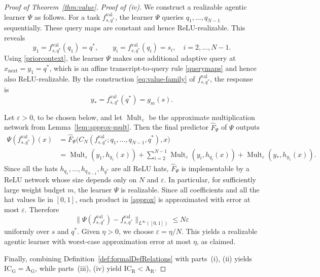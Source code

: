 \documentclass{article}
\newcommand{\ICG}{\mathrm{IC_G}}
\newcommand{\ICR}{\mathrm{IC_R}}
\newcommand{\AG}{\mathrm{A_G}}
\newcommand{\AR}{\mathrm{A_R}}
\begin{document}
\begin{proof}[Proof of Theorem~\ref{thm:value}]
\medskip
\noindent
\emph{Proof of (iv).}
We construct a realizable agentic learner $\Psi$ as follows.
For a task $f^{\mathrm{val}}_{s,q^\ast}$, the learner $\Psi$ queries $q_1,\dots,q_{N-1}$ sequentially. These query maps are constant and hence ReLU-realizable. This reveals
\begin{equation} \label{priorcontext}
    y_1=f^{\mathrm{val}}_{s,q^\ast}(q_1)=q^\ast,
    \qquad
    y_i=f^{\mathrm{val}}_{s,q^\ast}(q_i)=s_i,\quad i=2,\dots,N-1.
\end{equation}
Using \eqref{priorcontext}, the learner $\Psi$ makes one additional adaptive query at
$
    x_{\mathrm{next}}=y_1=q^\ast
$,
which is an affine transcript-to-query rule \eqref{querymaps} and hence also ReLU-realizable. 
By the construction \eqref{eq:value-family} of $f^{\mathrm{val}}_{s,q^\ast}$, the response is
\[
y_*=f^{\mathrm{val}}_{s,q^\ast}(q^\ast)=g_m(s).
\]

Let \(\varepsilon>0\), to be chosen below, and let
\(\operatorname{Mult}_{\varepsilon}\) be the approximate multiplication network from
Lemma~\ref{lem:approx-mult}. 
Then the final predictor $\widehat{F}_{\Psi}$ of $\Psi$ outputs
\begin{align} \label{approx}
    \nonumber \Psi(f^{\mathrm{val}}_{s,q^\ast})(x)
    &= 
    \widehat{F}_{\Psi}
    \bigl(C_N(f^{\mathrm{val}}_{s,q^\ast};q_1,\dots,q_{N-1},q^{\ast}),x\bigr)\\
    &=
    \operatorname{Mult}_{\varepsilon}(y_1,h_{q_1}(x))
    +
    \sum_{i=2}^{N-1}
    \operatorname{Mult}_{\varepsilon}(y_i,h_{q_i}(x))
    +
    \operatorname{Mult}_{\varepsilon}(y_*,h_{y_1}(x)).
\end{align}
Since all the hats $h_{q_1},\dots,h_{q_{N-1}}, h_{q^\ast}$ are all ReLU hats,
$\widehat{F}_{\Psi}$
is implementable by a ReLU network whose size depends only on $N$ and
\(\varepsilon\).
In particular, for sufficiently large weight budget $m$, the learner $\Psi$ is realizable.
Since all coefficients and all the hat values lie in $[0,1]$, each product in \eqref{approx} is approximated with error
at most \(\varepsilon\). Therefore
\[
    \|\Psi(f^{\mathrm{val}}_{s,q^\ast}) - f^{\mathrm{val}}_{s,q^\ast}\|_{L^\infty([0,1])}
    \leq N\varepsilon
\]
uniformly over $s$ and $q^\ast$. Given \(\eta>0\), we choose \(\varepsilon=\eta/N\). This yields a realizable agentic learner with worst-case approximation error at most $\eta$, as claimed.

Finally, combining Definition~\ref{def:formalDefRelations} with parts~(i), (ii) yields $\ICG=\AG$, while parts~(iii), (iv) yield $\ICR<\AR$.
\end{proof}
\end{document}
